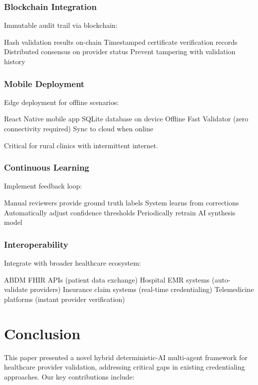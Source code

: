 \documentclass[conference]{IEEEtran}
\begin{document}
\subsubsection{Blockchain Integration}

Immutable audit trail via blockchain:

Hash validation results on-chain
Timestamped certificate verification records
Distributed consensus on provider status
Prevent tampering with validation history

\subsubsection{Mobile Deployment}

Edge deployment for offline scenarios:

React Native mobile app
SQLite database on device
Offline Fast Validator (zero connectivity required)
Sync to cloud when online

Critical for rural clinics with intermittent internet.

\subsubsection{Continuous Learning}

Implement feedback loop:

Manual reviewers provide ground truth labels
System learns from corrections
Automatically adjust confidence thresholds
Periodically retrain AI synthesis model

\subsubsection{Interoperability}

Integrate with broader healthcare ecosystem:

ABDM FHIR APIs (patient data exchange)
Hospital EMR systems (auto-validate providers)
Insurance claim systems (real-time credentialing)
Telemedicine platforms (instant provider verification)

\section{Conclusion}

This paper presented a novel hybrid deterministic-AI multi-agent framework for healthcare provider validation, addressing critical gaps in existing credentialing approaches. Our key contributions include:
\end{document}
